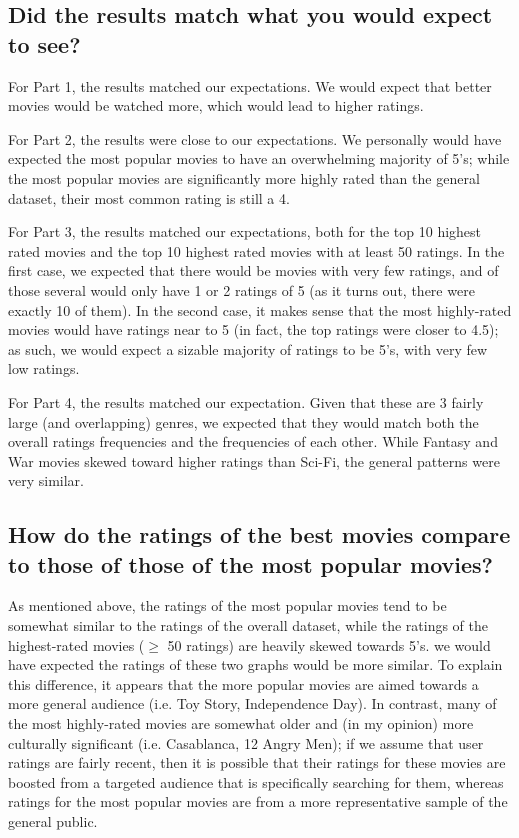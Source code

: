 \subsection*{Did the results match what you would expect to see?}
For Part 1, the results matched our expectations. We would expect that better movies would be watched more, which would lead to higher ratings. 

For Part 2, the results were close to our expectations. We personally would have expected the most popular movies to have an overwhelming majority of 5's; while the most popular movies are significantly more highly rated than the general dataset, their most common rating is still a 4.

For Part 3, the results matched our expectations, both for the top 10 highest rated movies and the top 10 highest rated movies with at least 50 ratings. In the first case, we expected that there would be movies with very few ratings, and of those several would only have 1 or 2 ratings of 5 (as it turns out, there were exactly 10 of them). In the second case, it makes sense that the most highly-rated movies would have ratings near to 5 (in fact, the top ratings were closer to 4.5); as such, we would expect a sizable majority of ratings to be 5's, with very few low ratings.

For Part 4, the results matched our expectation. Given that these are 3 fairly large (and overlapping) genres, we expected that they would match both the overall ratings frequencies and the frequencies of each other. While Fantasy and War movies skewed toward higher ratings than Sci-Fi, the general patterns were very similar.
\smallskip
\subsection*{How do the ratings of the best movies compare to those of those of the most popular movies?}
As mentioned above, the ratings of the most popular movies tend to be somewhat similar to the ratings of the overall dataset, while the ratings of the highest-rated movies ($\geq$ 50 ratings) are heavily skewed towards 5's. we would have expected the ratings of these two graphs would be more similar. To explain this difference, it appears that the more popular movies are aimed towards a more general audience (i.e. Toy Story, Independence Day). In contrast, many of the most highly-rated movies are somewhat older and (in my opinion) more culturally significant (i.e. Casablanca, 12 Angry Men); if we assume that user ratings are fairly recent, then it is possible that their ratings for these movies are boosted from a targeted audience that is specifically searching for them, whereas ratings for the most popular movies are from a more representative sample of the general public.

